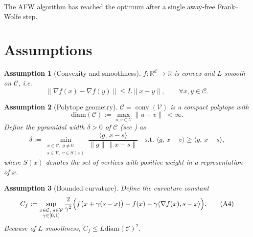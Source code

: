 \documentclass{article}
\newtheorem{assumption}{Assumption}
\newcommand{\R}{\mathbb{R}}
\newcommand{\C}{\mathcal{C}}
\newcommand{\V}{\mathcal{V}}
\newcommand{\diam}{\mathrm{diam}}
\newcommand{\curv}{C_f}
\begin{document}
The AFW algorithm has reached the optimum after a single away‑free Frank–Wolfe step.

\section*{Assumptions}
\begin{assumption}[Convexity and smoothness]\label{ass:convex_smooth}
$f:\R^d\rightarrow\R$ is convex and $L$‑smooth on $\C$, i.e.
\[
\|\nabla f(x)-\nabla f(y)\|\le L\|x-y\|,\qquad\forall x,y\in\C .
\tag{A1}
\]
\end{assumption}
\begin{assumption}[Polytope geometry]\label{ass:polytope}
$\C=\operatorname{conv}(\V)$ is a compact polytope with
\[
\diam(\C):=\max_{u,v\in\C}\|u-v\|\;<\infty .
\tag{A2}
\]
Define the \emph{pyramidal width} $\delta>0$ of $\C$ (see \cite{lacoste2015linear}) as
\[
\delta:=\min_{\substack{x\in\C,\;g\neq0\\
s\in\V,\;v\in S(x)}}
\frac{\langle g,\,x-s\rangle}{\|g\|\,\|x-s\|}
\quad\text{s.t. } \langle g,\,x-v\rangle\ge\langle g,\,x-s\rangle ,
\tag{A3}
\]
where $S(x)$ denotes the set of vertices with positive weight in a representation of $x$.
\end{assumption}
\begin{assumption}[Bounded curvature]\label{ass:curvature}
Define the curvature constant
\[
\curv:=\sup_{\substack{x\in\C,\;s\in\V\\
\gamma\in[0,1]}}
\frac{2}{\gamma^{2}}\Bigl(
f\bigl(x+\gamma(s-x)\bigr)-f(x)-\gamma\langle\nabla f(x),s-x\rangle
\Bigr).
\tag{A4}
\]
Because of $L$‑smoothness, $\curv\le L\diam(\C)^{2}$.
\end{assumption}

\end{document}
